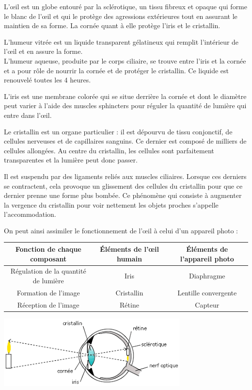 \documentclass[12pt, a4paper]{report}
\begin{document}
L'\oe il est un globe entouré par la sclérotique, un tissu fibreux et opaque qui forme le blanc de l'\oe il et qui le protège des agressions extérieures tout en assurant le maintien de sa forme. La cornée quant à elle protège l'iris et le cristallin.

L'humeur vitrée est un liquide transparent gélatineux qui remplit l'intérieur de l'\oe il et en assure la forme.\\
L'humeur aqueuse, produite par le corps ciliaire, se trouve entre l'iris et la cornée et a pour rôle de nourrir la cornée et de protéger le cristallin. Ce liquide est renouvelé toutes les 4 heures.

L'iris est une membrane colorée qui se situe derrière la cornée et dont le diamètre peut varier à l'aide des muscles sphincters pour réguler la quantité de lumière qui entre dans l'\oe il.

Le cristallin est un organe particulier : il est dépourvu de tissu conjonctif, de cellules nerveuses et de capillaires sanguins. Ce dernier est composé de milliers de cellules allongées. Au centre du cristallin, les cellules sont parfaitement transparentes et la lumière peut donc passer.

Il est suspendu par des ligaments reliés aux muscles ciliaires. Lorsque ces derniers se contractent, cela provoque un glissement des cellules du cristallin pour que ce dernier prenne une forme plus bombée. Ce phénomène qui consiste à augmenter la vergence du cristallin pour voir nettement les objets proches s'appelle l'accommodation.

On peut ainsi assimiler le fonctionnement de l'\oe il à celui d'un appareil photo :
{\small}
\begin{center}
\begin{tabular}{|c|c|c|}
\hline Fonction de chaque composant & \'{E}léments de l'\oe il humain & \'{E}léments de l'appareil photo\\\hline
Régulation de la quantité de lumière& Iris & Diaphragme \\\hline
Formation de l'image & Cristallin & Lentille convergente \\\hline
Réception de l'image & Rétine & Capteur \\\hline
\end{tabular}
\end{center}
{\small}

\begin{center}
\includegraphics[scale=0.8]{schema_oeil.png}
\end{center}
\end{document}
